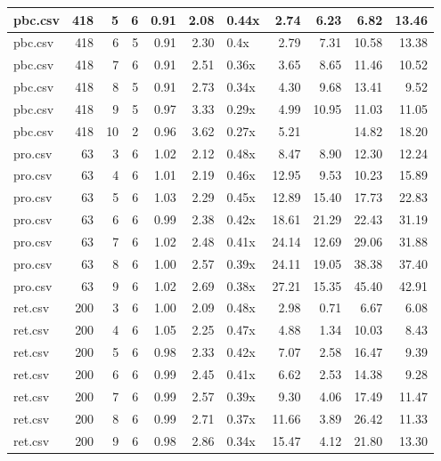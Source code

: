 \begin{table}[ht]
\begin{tabular}{lrrrrrlrrrr}
   \hline
pbc.csv & 418 &   5 &   6 & 0.91 & 2.08 & 0.44x & 2.74 & 6.23 & 6.82 & 13.46 \\ 
   \hline
pbc.csv & 418 &   6 &   5 & 0.91 & 2.30 & 0.4x & 2.79 & 7.31 & 10.58 & 13.38 \\ 
   \hline
pbc.csv & 418 &   7 &   6 & 0.91 & 2.51 & 0.36x & 3.65 & 8.65 & 11.46 & 10.52 \\ 
   \hline
pbc.csv & 418 &   8 &   5 & 0.91 & 2.73 & 0.34x & 4.30 & 9.68 & 13.41 & 9.52 \\ 
   \hline
pbc.csv & 418 &   9 &   5 & 0.97 & 3.33 & 0.29x & 4.99 & 10.95 & 11.03 & 11.05 \\ 
   \hline
pbc.csv & 418 &  10 &   2 & 0.96 & 3.62 & 0.27x & 5.21 &  & 14.82 & 18.20 \\ 
   \hline
pro.csv &  63 &   3 &   6 & 1.02 & 2.12 & 0.48x & 8.47 & 8.90 & 12.30 & 12.24 \\ 
   \hline
pro.csv &  63 &   4 &   6 & 1.01 & 2.19 & 0.46x & 12.95 & 9.53 & 10.23 & 15.89 \\ 
   \hline
pro.csv &  63 &   5 &   6 & 1.03 & 2.29 & 0.45x & 12.89 & 15.40 & 17.73 & 22.83 \\ 
   \hline
pro.csv &  63 &   6 &   6 & 0.99 & 2.38 & 0.42x & 18.61 & 21.29 & 22.43 & 31.19 \\ 
   \hline
pro.csv &  63 &   7 &   6 & 1.02 & 2.48 & 0.41x & 24.14 & 12.69 & 29.06 & 31.88 \\ 
   \hline
pro.csv &  63 &   8 &   6 & 1.00 & 2.57 & 0.39x & 24.11 & 19.05 & 38.38 & 37.40 \\ 
   \hline
pro.csv &  63 &   9 &   6 & 1.02 & 2.69 & 0.38x & 27.21 & 15.35 & 45.40 & 42.91 \\ 
   \hline
ret.csv & 200 &   3 &   6 & 1.00 & 2.09 & 0.48x & 2.98 & 0.71 & 6.67 & 6.08 \\ 
   \hline
ret.csv & 200 &   4 &   6 & 1.05 & 2.25 & 0.47x & 4.88 & 1.34 & 10.03 & 8.43 \\ 
   \hline
ret.csv & 200 &   5 &   6 & 0.98 & 2.33 & 0.42x & 7.07 & 2.58 & 16.47 & 9.39 \\ 
   \hline
ret.csv & 200 &   6 &   6 & 0.99 & 2.45 & 0.41x & 6.62 & 2.53 & 14.38 & 9.28 \\ 
   \hline
ret.csv & 200 &   7 &   6 & 0.99 & 2.57 & 0.39x & 9.30 & 4.06 & 17.49 & 11.47 \\ 
   \hline
ret.csv & 200 &   8 &   6 & 0.99 & 2.71 & 0.37x & 11.66 & 3.89 & 26.42 & 11.33 \\ 
   \hline
ret.csv & 200 &   9 &   6 & 0.98 & 2.86 & 0.34x & 15.47 & 4.12 & 21.80 & 13.30 \\ 

\end{tabular}
\end{table}
